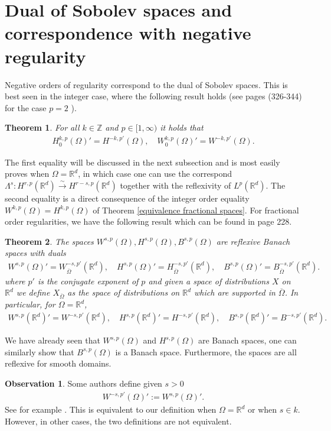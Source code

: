 \documentclass[
    a4paper,
    DIV=14,
    abstract=true,
    numbers=noenddot
]
{scrartcl}
\newtheorem{theorem}{Theorem}[section]
\theoremstyle{definition}
\newtheorem{observation}{Observation}
\newcommand{\iso}{\xrightarrow{\sim}}
\newcommand{\R}{\mathbb{R}}
\begin{document}
\section{Dual of Sobolev spaces and correspondence with negative regularity}
Negative orders of regularity correspond to the dual of Sobolev spaces. This is best seen in the integer case, where the following result holds (see \cite{evans2022partial} pages (326-344) for the case $p=2$ ).
\begin{theorem}\label{dual of integer sobolev}
  For all $k \in \mathbb{Z}$ and $p \in [1,\infty)$ it holds that
  \begin{align*}
    H^{k,p}_0(\Omega )' = H^{-k,p'}(\Omega ), \quad W^{k,p}_0(\Omega )' = W^{-k,p'}(\Omega ).
  \end{align*}
\end{theorem}
The first equality will be discussed in the next subsection and is most easily proves when $\Omega =\R^d$, in which case one can use the correspond $\Lambda ^s : H^{r,p}(\R^d )\iso H^{r-s,p}(\R^d )$ together with the reflexivity of $L^p(\R^d )$. The second equality is a direct consequence of the integer order equality $W^{k,p}(\Omega )=H^{k,p}(\Omega )$ of Theorem \ref{equivalence fractional spaces}. For fractional order regularities, we have the following result which can be found in \cite{agranovich2015sobolev} page 228.
\begin{theorem}
  The spaces $W^{s,p}(\Omega ),H^{s,p}(\Omega ),B^{s,p}(\Omega )$ are reflexive Banach spaces with duals
  \begin{align*}
    W^{s,p}(\Omega )'=	W^{-s,p'}_{\overline{\Omega } }(\R^d ), \quad H^{s,p}(\Omega )' = H^{-s,p'}_{\overline{\Omega } }(\R^d ), \quad B^{s,p}(\Omega )' = B^{-s,p'}_{\overline{\Omega } }(\R^d ).
  \end{align*}
  where $p'$ is the conjugate exponent of $p$ and given a space of distributions $X$ on $\R^d$ we define $X_{\overline{\Omega }}$ as the space of distributions on $\R^d$ which are supported in $\overline{\Omega }$. In particular, for $\Omega =\R^d$,
  \begin{align*}
    W^{s,p}(\R^d )'=	W^{-s,p'}(\R^d ), \quad H^{s,p}(\R^d )' = H^{-s,p'}(\R^d ), \quad B^{s,p}(\R^d )' = B^{-s,p'}(\R^d ).
  \end{align*}
\end{theorem}
We have already seen that $W^{s,p}(\Omega )$ and $H^{s,p}(\Omega )$ are Banach spaces, one can similarly show that $B^{s,p}(\Omega )$ is a Banach space. Furthermore, the spaces are all reflexive for smooth domains.
\begin{observation}
  Some authors define given $s>0$
  \begin{align*}
    W^{-s,p'}(\Omega )':=	W^{s,p}(\Omega )'.
  \end{align*}
  See for example \cite{biccari2018local}. This is equivalent to our definition when $\Omega = \R^d$ or when $s \in k$. However, in other cases, the two definitions are not equivalent.
\end{observation}
\end{document}

